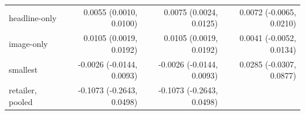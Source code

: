 \begin{tabular}{lrrrrrrl}
headline-only & \multicolumn{2}{r}{0.0055 (0.0010, 0.0100)} & \multicolumn{2}{r}{0.0075 (0.0024, 0.0125)} & \multicolumn{3}{r}{0.0072 (-0.0065, 0.0210)} \\
image-only & \multicolumn{2}{r}{0.0105 (0.0019, 0.0192)} & \multicolumn{2}{r}{0.0105 (0.0019, 0.0192)} & \multicolumn{3}{r}{0.0041 (-0.0052, 0.0134)} \\
smallest & \multicolumn{2}{r}{-0.0026 (-0.0144, 0.0093)} & \multicolumn{2}{r}{-0.0026 (-0.0144, 0.0093)} & \multicolumn{3}{r}{0.0285 (-0.0307, 0.0877)} \\
retailer, pooled & \multicolumn{2}{r}{-0.1073 (-0.2643, 0.0498)} & \multicolumn{2}{r}{-0.1073 (-0.2643, 0.0498)} & \multicolumn{3}{r}{} \\
\bottomrule
\end{tabular}
